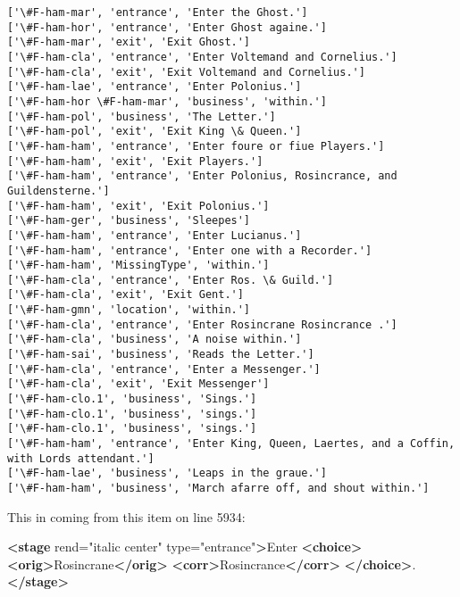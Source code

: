 \documentclass[11pt]{article}
\newenvironment{Shaded}{}{}
\newcommand{\KeywordTok}[1]{\textcolor[rgb]{0.00,0.44,0.13}{\textbf{{#1}}}}
\newcommand{\StringTok}[1]{\textcolor[rgb]{0.25,0.44,0.63}{{#1}}}
\newcommand{\OtherTok}[1]{\textcolor[rgb]{0.00,0.44,0.13}{{#1}}}
\newcommand{\NormalTok}[1]{{#1}}
\begin{document}
    \begin{Verbatim}[commandchars=\\\{\}]
['\#F-ham-mar', 'entrance', 'Enter the Ghost.']
['\#F-ham-hor', 'entrance', 'Enter Ghost againe.']
['\#F-ham-mar', 'exit', 'Exit Ghost.']
['\#F-ham-cla', 'entrance', 'Enter Voltemand and Cornelius.']
['\#F-ham-cla', 'exit', 'Exit Voltemand and Cornelius.']
['\#F-ham-lae', 'entrance', 'Enter Polonius.']
['\#F-ham-hor \#F-ham-mar', 'business', 'within.']
['\#F-ham-pol', 'business', 'The Letter.']
['\#F-ham-pol', 'exit', 'Exit King \& Queen.']
['\#F-ham-ham', 'entrance', 'Enter foure or fiue Players.']
['\#F-ham-ham', 'exit', 'Exit Players.']
['\#F-ham-ham', 'entrance', 'Enter Polonius, Rosincrance, and Guildensterne.']
['\#F-ham-ham', 'exit', 'Exit Polonius.']
['\#F-ham-ger', 'business', 'Sleepes']
['\#F-ham-ham', 'entrance', 'Enter Lucianus.']
['\#F-ham-ham', 'entrance', 'Enter one with a Recorder.']
['\#F-ham-ham', 'MissingType', 'within.']
['\#F-ham-cla', 'entrance', 'Enter Ros. \& Guild.']
['\#F-ham-cla', 'exit', 'Exit Gent.']
['\#F-ham-gmn', 'location', 'within.']
['\#F-ham-cla', 'entrance', 'Enter Rosincrane Rosincrance .']
['\#F-ham-cla', 'business', 'A noise within.']
['\#F-ham-sai', 'business', 'Reads the Letter.']
['\#F-ham-cla', 'entrance', 'Enter a Messenger.']
['\#F-ham-cla', 'exit', 'Exit Messenger']
['\#F-ham-clo.1', 'business', 'Sings.']
['\#F-ham-clo.1', 'business', 'sings.']
['\#F-ham-clo.1', 'business', 'sings.']
['\#F-ham-ham', 'entrance', 'Enter King, Queen, Laertes, and a Coffin, with Lords attendant.']
['\#F-ham-lae', 'business', 'Leaps in the graue.']
['\#F-ham-ham', 'business', 'March afarre off, and shout within.']

    \end{Verbatim}

    This in coming from this item on line 5934:

\begin{Shaded}
\begin{Highlighting}[]
\KeywordTok{<stage}\OtherTok{ rend=}\StringTok{"italic center"}\OtherTok{ type=}\StringTok{"entrance"}\KeywordTok{>}\NormalTok{Enter }\KeywordTok{<choice>}
                                    \KeywordTok{<orig>}\NormalTok{Rosincrane}\KeywordTok{</orig>}
                                    \KeywordTok{<corr>}\NormalTok{Rosincrance}\KeywordTok{</corr>}
                                \KeywordTok{</choice>}\NormalTok{.}\KeywordTok{</stage>}
\end{Highlighting}
\end{Shaded}
\end{document}
